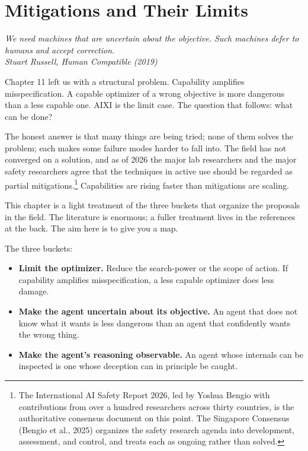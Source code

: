 \chapter{Mitigations and Their Limits}

\vspace{1em}
\hfill
\begin{minipage}[c]{0.55\textwidth}
\raggedleft
\small\itshape
We need machines that are uncertain about the objective. Such machines defer to humans and accept correction.\\[0.5em]
\upshape\footnotesize Stuart Russell, \textit{Human Compatible} (2019)
\end{minipage}%
\hspace{0.5em}
\begin{minipage}[c]{0.12\textwidth}
\end{minipage}
\vspace{1.5em}

\noindent Chapter 11 left us with a structural problem. Capability amplifies misspecification. A capable optimizer of a wrong objective is more dangerous than a less capable one. AIXI is the limit case. The question that follows: what can be done?

The honest answer is that many things are being tried; none of them solves the problem; each makes some failure modes harder to fall into. The field has not converged on a solution, and as of 2026 the major lab researchers and the major safety researchers agree that the techniques in active use should be regarded as partial mitigations.\footnote{The International AI Safety Report 2026, led by Yoshua Bengio with contributions from over a hundred researchers across thirty countries, is the authoritative consensus document on this point. The Singapore Consensus (Bengio et al., 2025) organizes the safety research agenda into development, assessment, and control, and treats each as ongoing rather than solved.} Capabilities are rising faster than mitigations are scaling.

This chapter is a light treatment of the three buckets that organize the proposals in the field. The literature is enormous; a fuller treatment lives in the references at the back. The aim here is to give you a map.

The three buckets:

\begin{itemize}
\item \textbf{Limit the optimizer.} Reduce the search-power or the scope of action. If capability amplifies misspecification, a less capable optimizer does less damage.
\item \textbf{Make the agent uncertain about its objective.} An agent that does not know what it wants is less dangerous than an agent that confidently wants the wrong thing.
\item \textbf{Make the agent's reasoning observable.} An agent whose internals can be inspected is one whose deception can in principle be caught.
\end{itemize}

